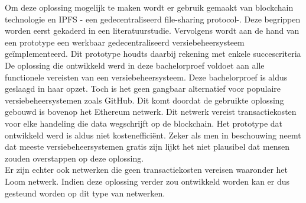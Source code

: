 Om deze oplossing mogelijk te maken wordt er gebruik gemaakt van blockchain technologie en IPFS - een gedecentraliseerd file-sharing protocol-. Deze begrippen worden eerst gekaderd in een literatuurstudie. Vervolgens wordt aan de hand van een prototype een werkbaar gedecentraliseerd versiebeheersysteem geïmplementeerd. Dit prototype houdts daarbij rekening met enkele succescriteria\\

De oplossing die ontwikkeld werd in deze bachelorproef voldoet aan alle functionele vereisten van een versiebeheersysteem. Deze bachelorproef is aldus geslaagd in haar opzet. Toch is het geen gangbaar alternatief voor populaire versiebeheersystemen zoals GitHub. Dit komt doordat de gebruikte oplossing gebouwd is bovenop het Ethereum netwerk. Dit netwerk vereist transactiekosten voor elke handeling die data wegschrijft op de blockchain. Het prototype dat ontwikkeld werd is aldus niet kostenefficiënt. Zeker als men in beschouwing neemt dat meeste versiebeheersystemen gratis zijn lijkt het niet plausibel dat mensen zouden overstappen op deze oplossing.\\

Er zijn echter ook netwerken die geen transactiekosten vereisen waaronder het Loom netwerk. Indien deze oplossing verder zou ontwikkeld worden kan er dus gesteund worden op dit type van netwerken.